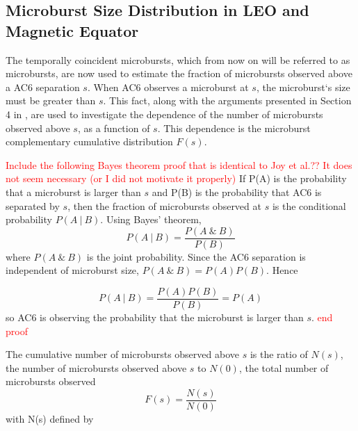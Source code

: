 \documentclass[draft]{agujournal2019}
\begin{document}
\subsection{Microburst Size Distribution in LEO and Magnetic Equator}\label{microburst_distribution}
The temporally coincident microbursts, which from now on will be referred to as microbursts, are now used to estimate the fraction of microbursts observed above a AC6 separation $s$. When AC6 observes a microburst at $s$, the microburst`s size must be greater than $s$. This fact, along with the arguments presented in Section 4 in , are used to investigate the dependence of the number of microbursts observed above $s$, as a function of $s$. This dependence is the microburst complementary cumulative distribution $F(s)$. 

\textcolor{red}{Include the following Bayes theorem proof that is identical to Joy et al.?? It does not seem necessary (or I did not motivate it properly)} If P(A) is the probability that a microburst is larger than $s$ and P(B) is the probability that AC6 is separated by $s$, then the fraction of microbursts observed at $s$ is the conditional probability $P(A \ \vert \ B)$. Using Bayes’ theorem, 
\begin{equation}
P(A \ \vert \ B) = \frac{P(A \ \& \ B)}{P(B)}
\end{equation} where $P(A \ \& \ B)$ is the joint probability. Since the AC6 separation is independent of microburst size, $P(A \ \& \ B) = P(A)P(B)$. Hence

\begin{equation}
P(A \ \vert \ B) = \frac{P(A)P(B)}{P(B)} = P(A)
\end{equation} so AC6 is observing the probability that the microburst is larger than $s$. \textcolor{red}{end proof}

The cumulative number of microbursts observed above $s$ is the ratio of $N(s)$, the number of microbursts observed above $s$ to $N(0)$, the total number of microbursts observed 
\begin{equation}
F(s) = \frac{N(s)}{N(0)}
\end{equation} with N(s) defined by
\end{document}

